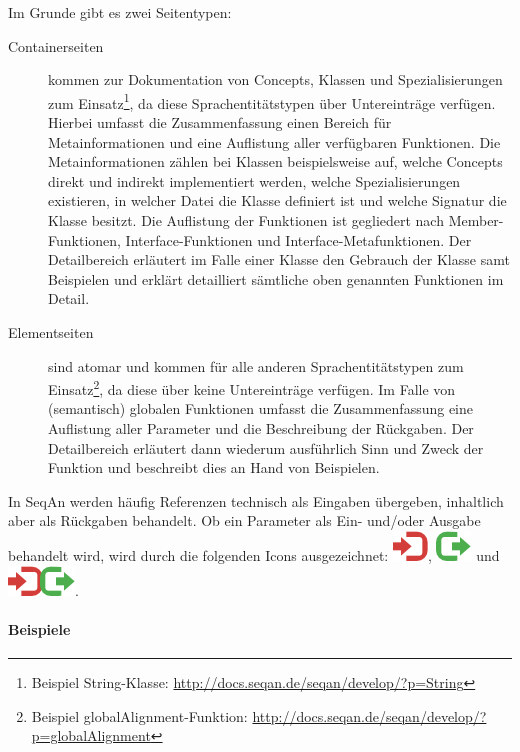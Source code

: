Im Grunde gibt es zwei Seitentypen:
\begin{description}
  \item[Containerseiten] kommen zur Dokumentation von Concepts, Klassen und Spezialisierungen zum Einsatz\footnote{Beispiel String-Klasse: \url{http://docs.seqan.de/seqan/develop/?p=String}}, da diese Sprachentitätstypen über Untereinträge verfügen. Hierbei umfasst die Zusammenfassung einen Bereich für Metainformationen und eine Auflistung aller verfügbaren Funktionen. Die Metainformationen zählen bei Klassen beispielsweise auf, welche Concepts direkt und indirekt implementiert werden, welche Spezialisierungen existieren, in welcher Datei die Klasse definiert ist und welche Signatur die Klasse besitzt. Die Auflistung der Funktionen ist gegliedert nach Member-Funktionen, Interface-Funktionen und Interface-Metafunktionen. Der Detailbereich erläutert im Falle einer Klasse den Gebrauch der Klasse samt Beispielen und erklärt detailliert sämtliche oben genannten Funktionen im Detail.
  \item[Elementseiten] sind atomar und kommen für alle anderen Sprachentitätstypen zum Einsatz\footnote{Beispiel globalAlignment-Funktion: \url{http://docs.seqan.de/seqan/develop/?p=globalAlignment}}, da diese über keine Untereinträge verfügen. Im Falle von (semantisch) globalen Funktionen umfasst die Zusammenfassung eine Auflistung aller Parameter und die Beschreibung der Rückgaben. Der Detailbereich erläutert dann wiederum ausführlich Sinn und Zweck der Funktion und beschreibt dies an Hand von Beispielen.
\end{description}

In SeqAn werden häufig Referenzen technisch als Eingaben übergeben, inhaltlich aber als Rückgaben behandelt. Ob ein Parameter als Ein- und/oder Ausgabe behandelt wird, wird durch die folgenden Icons ausgezeichnet: \includegraphics[height=.7em]{Figures/dox/in.png}, \includegraphics[height=.7em]{Figures/dox/out.png} und \includegraphics[height=.7em]{Figures/dox/inout.png}.


\paragraph{Beispiele}

